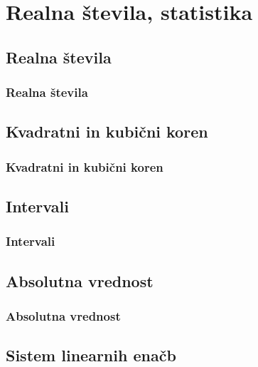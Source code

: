 \section{Realna števila, statistika}

\begin{frame}
    \sectionpage
\end{frame}

\begin{frame}
\end{frame}

    \subsection{Realna števila}

        \begin{frame}
            \frametitle{Realna števila}
        \end{frame}

    \subsection{Kvadratni in kubični koren}

        \begin{frame}
            \frametitle{Kvadratni in kubični koren}
        \end{frame}

    \subsection{Intervali}

        \begin{frame}
            \frametitle{Intervali}
        \end{frame}

    \subsection{Absolutna vrednost}

        \begin{frame}
            \frametitle{Absolutna vrednost}
        \end{frame}

    \subsection{Sistem linearnih enačb}


